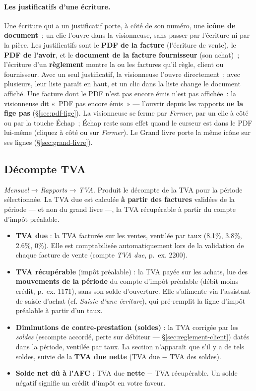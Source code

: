 \documentclass[a4paper,11pt,oneside]{article}
\begin{document}
\paragraph{Les justificatifs d'une écriture.}\label{sec:journal-justificatifs} Une écriture qui a un justificatif porte, à côté de son numéro, une \textbf{icône de document}~; un clic l'ouvre dans la visionneuse, sans passer par l'écriture ni par la pièce. Les justificatifs sont le \textbf{PDF de la facture} (l'écriture de vente), le \textbf{PDF de l'avoir}, et le \textbf{document de la facture fournisseur} (son achat)~; l'écriture d'un \textbf{règlement} montre la ou les factures qu'il règle, client ou fournisseur. Avec un seul justificatif, la visionneuse l'ouvre directement~; avec plusieurs, leur liste paraît en haut, et un clic dans la liste change le document affiché. Une facture dont le PDF n'est pas encore émis n'est pas affichée~: la visionneuse dit «~PDF pas encore émis~» --- l'ouvrir depuis les rapports \textbf{ne la fige pas} (\S\ref{sec:pdf-fige}). La visionneuse se ferme par \emph{Fermer}, par un clic à côté ou par la touche Échap~; Échap reste sans effet quand le curseur est dans le PDF lui-même (cliquez à côté ou sur \emph{Fermer}). Le Grand livre porte la même icône sur ses lignes (\S\ref{sec:grand-livre}).

\subsection{Décompte TVA}\label{sec:decompte-tva}

\emph{Mensuel} → \emph{Rapports} → \emph{TVA}. Produit le décompte de la TVA pour la période sélectionnée. La TVA due est calculée \textbf{à partir des factures} validées de la période --- et non du grand livre ---, la TVA récupérable à partir du compte d'impôt préalable.

\begin{itemize}
    \item \textbf{TVA due} : la TVA facturée sur les ventes, ventilée par taux (8.1\%, 3.8\%, 2.6\%, 0\%). Elle est comptabilisée automatiquement lors de la validation de chaque facture de vente (compte \emph{TVA due}, p.~ex. 2200).
    \item \textbf{TVA récupérable} (impôt préalable) : la TVA payée sur les achats, lue des \textbf{mouvements de la période} du compte d'impôt préalable (débit moins crédit, p.~ex. 1171), sans son solde d'ouverture. Elle s'alimente via l'assistant de saisie d'achat (cf. \emph{Saisie d'une écriture}), qui pré-remplit la ligne d'impôt préalable à partir d'un taux.
    \item \textbf{Diminutions de contre-prestation (soldes)} : la TVA corrigée par les \emph{soldes} (escompte accordé, perte sur débiteur --- \S\ref{sec:reglement-client}) datés dans la période, ventilée par taux. La section n'apparaît que s'il y a de tels soldes, suivie de la \textbf{TVA due nette} (TVA due − TVA des soldes).
    \item \textbf{Solde net dû à l'AFC} : TVA due \textbf{nette} − TVA récupérable. Un solde négatif signifie un crédit d'impôt en votre faveur.
\end{itemize}
\end{document}
